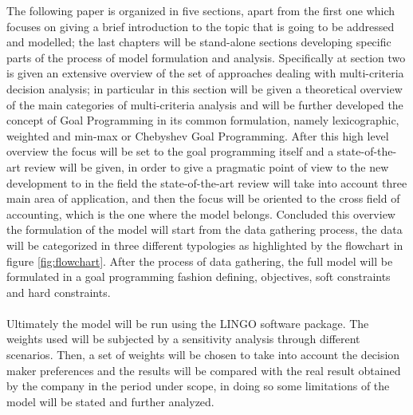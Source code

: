\documentclass{article}
\begin{document}
The following paper is organized in five sections, apart from the first one which focuses on giving a brief introduction to the topic that is going to be addressed and modelled; the last chapters will be stand-alone sections developing specific parts of the process of model formulation and analysis. Specifically at section two is given an extensive overview of the set of approaches dealing with multi-criteria decision analysis; in particular in this section will be given a theoretical overview of the main categories of multi-criteria analysis and will be further developed the concept of Goal Programming in its common formulation, namely lexicographic, weighted and min-max or Chebyshev Goal Programming. After this high level overview the focus will be set to the goal programming itself and a state-of-the-art review will be given, in order to give a pragmatic point of view to the new development to in the field the state-of-the-art review will take into account three main area of application, and then the focus will be oriented to the cross field of accounting, which is the one where the model belongs. Concluded this overview the formulation of the model will start from the data gathering process, the data will be categorized in three different typologies as highlighted by the flowchart in figure \ref{fig:flowchart}. After the process of data gathering, the full model will be formulated in a goal programming fashion defining, objectives, soft constraints and hard constraints.
\\
\\
Ultimately the model will be run using the LINGO software package. The weights used will be subjected by a sensitivity analysis through different scenarios. Then, a set of weights will be chosen to take into account the decision maker preferences and the results will be compared with the real result obtained by the company in the period under scope, in doing so some limitations of the model will be stated and further analyzed.

\pagebreak 
\end{document}
